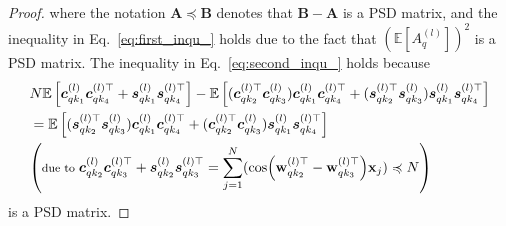 \begin{proof}
\begin{comment}
& \bm{c}_{i1}^{(l)}\bm{c}_{i1}^{(l)\top}
+ \bm{s}_{i1}^{(l)}\bm{s}_{i1}^{(l)\top} 
+\bm{c}_{i2}^{(l)}\bm{c}_{i2}^{(l)\top}
+\bm{s}_{i2}^{(l)}\bm{s}_{i2}^{(l)\top} +\bm{c}_{i1}^{(l)}\bm{c}_{i2}^{(l)\top}
+\bm{s}_{i1}^{(l)}\bm{s}_{i2}^{(l)\top} +\bm{c}_{i2}^{(l)}\bm{c}_{i1}^{(l)\top}
+\bm{s}_{i2}^{(l)}\bm{s}_{i1}^{(l)\top} + \\  
& \bm{c}_{i1}^{(l)}\bm{c}_{i1}^{(l)\top}
+ \bm{s}_{i1}^{(l)}\bm{s}_{i1}^{(l)\top} 
+\bm{c}_{i2}^{(l)}\bm{c}_{i2}^{(l)\top}
+\bm{s}_{i2}^{(l)}\bm{s}_{i2}^{(l)\top} +\bm{c}_{i1}^{(l)}\bm{c}_{i2}^{(l)\top}
+\bm{s}_{i1}^{(l)}\bm{s}_{i2}^{(l)\top} +\bm{c}_{i2}^{(l)}\bm{c}_{i1}^{(l)\top}
+\bm{s}_{i2}^{(l)}\bm{s}_{i1}^{(l)\top} + \\ 
\end{aligned}
\end{equation}
\end{comment}

where the notation $\mathbf{A} \preccurlyeq \mathbf{B}$ denotes that $\mathbf{B} - \mathbf{A}$ is a PSD matrix, and the inequality in Eq.~\eqref{eq:first_inqu_} holds due to the fact that $\left(\mathbb{E}\left[A_{q}^{(l)}\right]\right)^2$ is a PSD matrix. The inequality in Eq.~\eqref{eq:second_inqu_} holds because 
\begin{equation}
\setlength{\abovedisplayskip}{8pt}
\setlength{\belowdisplayskip}{8pt}
    \begin{aligned}
        & N \mathbb{E}\left[\bm{c}_{qk_1}^{(l)}\bm{c}_{qk_4}^{(l)\top}+\bm{s}_{qk_1}^{(l)}\bm{s}_{qk_4}^{(l)\top}\right] - \mathbb{E}\left[(\bm{c}_{qk_2}^{(l)\top}\bm{c}_{qk_3}^{(l)})\bm{c}_{qk_1}^{(l)}\bm{c}_{qk_4}^{(l)\top} + (\bm{s}_{qk_2}^{(l)\top}\bm{s}_{qk_3}^{(l)})\bm{s}_{qk_1}^{(l)}\bm{s}_{qk_4}^{(l)\top}\right] \\
        & = \mathbb{E}\left[(\bm{s}_{qk_2}^{(l)\top}\bm{s}_{qk_3}^{(l)})\bm{c}_{qk_1}^{(l)}\bm{c}_{qk_4}^{(l)\top} + (\bm{c}_{qk_2}^{(l)\top}\bm{c}_{qk_3}^{(l)})\bm{s}_{qk_1}^{(l)}\bm{s}_{qk_4}^{(l)\top} \right]  \\ &\footnotesize{\left(\text{due to }  \bm{c}_{qk_2}^{(l)}\bm{c}_{qk_3}^{(l)\top}+\bm{s}_{qk_2}^{(l)}\bm{s}_{qk_3}^{(l)\top} = \sum_{j=1}^N(\cos(\w_{qk_2}^{(l)\top} - \w_{qk_3}^{(l)\top})\x_j)
        \preccurlyeq N \right)}
    \end{aligned}
\end{equation}
is a PSD matrix.


\end{proof}
